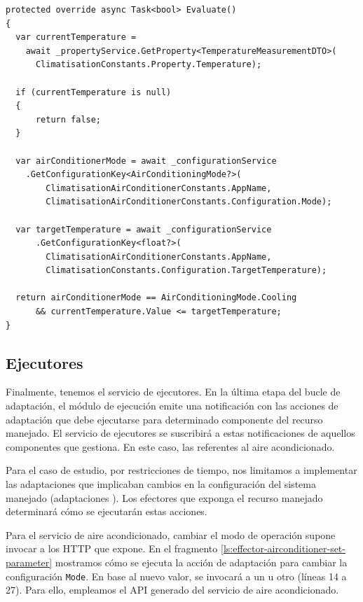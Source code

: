 \begin{lstlisting}[language={[Sharp]C},caption={Implementación de referencia del método \texttt{Evaluate}. La regla obtiene del conocimiento el estado actual del sistema y determina si debe ejecutarse.},captionpos=b, label=ls:adaption-rule-evaluate-condition]
protected override async Task<bool> Evaluate()
{
  var currentTemperature =
    await _propertyService.GetProperty<TemperatureMeasurementDTO>(
      ClimatisationConstants.Property.Temperature);

  if (currentTemperature is null)
  {
      return false;
  }

  var airConditionerMode = await _configurationService
    .GetConfigurationKey<AirConditioningMode?>(
        ClimatisationAirConditionerConstants.AppName,
        ClimatisationAirConditionerConstants.Configuration.Mode);

  var targetTemperature = await _configurationService
      .GetConfigurationKey<float?>(
        ClimatisationAirConditionerConstants.AppName,
        ClimatisationConstants.Configuration.TargetTemperature);

  return airConditionerMode == AirConditioningMode.Cooling
      && currentTemperature.Value <= targetTemperature;
}
\end{lstlisting}

\subsection{Ejecutores}

Finalmente, tenemos el servicio de ejecutores. En la última etapa del bucle de adaptación, el módulo de ejecución emite una notificación con las acciones de adaptación que debe ejecutarse para determinado componente del recurso manejado. El servicio de ejecutores se suscribirá a estas notificaciones de aquellos componentes que gestiona. En este caso, las referentes al aire acondicionado.

Para el caso de estudio, por restricciones de tiempo, nos limitamos a implementar las adaptaciones que implicaban cambios en la configuración del sistema manejado (adaptaciones ). Los efectores que exponga el recurso manejado determinará cómo se ejecutarán estas acciones.

Para el servicio de aire acondicionado, cambiar el modo de operación supone invocar a los  HTTP que expone. En el fragmento \ref{ls:effector-airconditioner-set-parameter} mostramos cómo se ejecuta la acción de adaptación para cambiar la configuración \texttt{Mode}. En base al nuevo valor, se invocará a un  u otro (líneas 14 a 27). Para ello, empleamos el API  generado del servicio de aire acondicionado.

